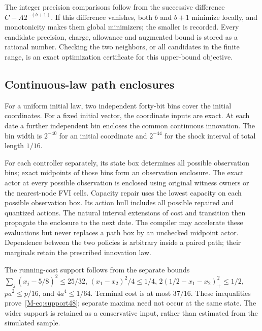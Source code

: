 The integer precision comparisons follow from the successive difference $C-A2^{-(b+1)}$. If this difference vanishes, both $b$ and $b+1$ minimize locally, and monotonicity makes them global minimizers; the smaller is recorded. Every candidate precision, charge, allowance and augmented bound is stored as a rational number. Checking the two neighbors, or all candidates in the finite range, is an exact optimization certificate for this upper-bound objective.

\subsection{Continuous-law path enclosures}
For a uniform initial law, two independent forty-bit bins cover the initial coordinates. For a fixed initial vector, the coordinate inputs are exact. At each date a further independent bin encloses the common continuous innovation. The bin width is $2^{-40}$ for an initial coordinate and $2^{-44}$ for the shock interval of total length $1/16$.

For each controller separately, its state box determines all possible observation bins; exact midpoints of those bins form an observation enclosure. The exact actor at every possible observation is enclosed using original witness owners or the nearest-node FVI cells. Capacity repair uses the lowest capacity on each possible observation box. Its action hull includes all possible repaired and quantized actions. The natural interval extensions of cost and transition then propagate the enclosure to the next date. The compiler may accelerate these evaluations but never replaces a path box by an unchecked midpoint actor. Dependence between the two policies is arbitrary inside a paired path; their marginals retain the prescribed innovation law.

The running-cost support follows from the separate bounds $\sum_j(x_j-5/8)^2\le25/32$, $(x_1-x_2)^2/4\le1/4$, $2(1/2-x_1-x_2)_+^2\le1/2$, $pa^2\le p/16$, and $4a^4\le1/64$. Terminal cost is at most $37/16$. These inequalities prove~\eqref{M-eq:support48}; separate maxima need not occur at the same state. The wider support is retained as a conservative input, rather than estimated from the simulated sample.

